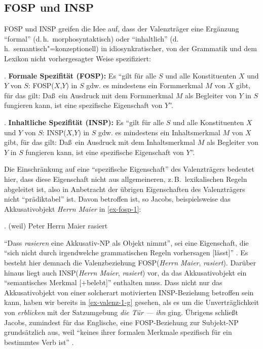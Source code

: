 \subsection{FOSP und INSP} 

FOSP und INSP greifen die Idee auf, dass der Valenzträger eine Ergänzung "`formal"' (d.\,h.\ morphosyntaktisch) oder "`inhaltlich"' (d.\,h.\ semantisch"=konzeptionell) in idiosynkratischer, von der Grammatik und dem Lexikon nicht vorhergesagter Weise spezifiziert:

\ex. {\bf Formale Spezifität (FOSP):}  Es "`gilt für alle $S$ und alle Konstituenten $X$ und $Y$ von $S$: FOSP($X$,$Y$) in $S$ gdw. es mindestens ein Formmerkmal $M$ von $X$ gibt, für das gilt: Da\ss \ ein Ausdruck mit dem Formmerkmal $M$ als Begleiter von $Y$ in $S$ fungieren kann, ist eine spezifische Eigenschaft von $Y$"'. \citep[22]{Jacobs:94}

\ex. {\bf Inhaltliche Spezifität (INSP):} Es "`gilt für alle $S$ und alle Konstituenten $X$ und $Y$ von $S$: INSP($X$,$Y$) in $S$ gdw. es mindestens ein Inhaltsmerkmal $M$ von $X$ gibt, für das gilt: Da\ss \ ein Ausdruck mit dem Inhaltsmerkmal $M$ als Begleiter von $Y$ in $S$ fungieren kann, ist eine spezifische Eigenschaft von $Y$"'. \citep[22]{Jacobs:94}

Die Einschränkung auf eine "`spezifische Eigenschaft"' des Valenzträgers bedeutet hier, dass diese Eigenschaft nicht aus allgemeineren, z.\,B.\ lexikalischen Regeln abgeleitet ist, also in Anbetracht der übrigen Eigenschaften des Valenzträgers nicht "`prädiktabel"' ist. Davon betroffen ist, so Jacobs, beispielsweise das Akkusativobjekt {\it Herrn Maier} in \ref{ex-fosp-1}:

\ex. \label{ex-fosp-1}(weil) Peter Herrn Maier rasiert 

"`Dass {\it rasieren} eine Akkusativ-NP als Objekt nimmt"', sei eine Eigenschaft, die "`sich nicht durch irgendwelche grammatischen Regeln vorhersagen [lässt]"' \citep[23]{Jacobs:94}.  Es besteht hier demnach die Valenzbeziehung FOSP({\it Herrn Maier}, {\it rasiert}). Darüber hinaus liegt auch INSP({\it Herrn Maier}, {\it rasiert}) vor, da das Akkusativobjekt ein "`semantisches Merkmal [+belebt]"'  enthalten muss. Dass nicht nur das Akkusativobjekt von einer solcherart motivierten INSP-Bezie\-hung betroffen sein kann, haben wir bereits in \ref{ex-valenz-1-g} gesehen, als es um die Unverträglichkeit von {\it erblicken} mit der Satzumgebung \textit{die Tür --- ihn} ging. Übrigens schließt Jacobs, zumindest für das Englische, eine FOSP-Beziehung zur Subjekt-NP grundsätzlich aus, weil "`keines ihrer formalen Merkmale spezifisch für ein bestimmtes Verb ist"' \citep[37]{Jacobs:94}.

